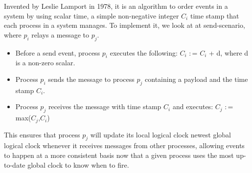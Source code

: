 Invented by Leslie Lamport in 1978, it is an algorithm to order events in a system by using scalar time, a simple non-negative integer $C_i$ time stamp that each process in a system manages. To implement it, we look at at send-scenario, where $p_i$ relays a message to $p_j$.

\begin{itemize}
	\item Before a send event, process $p_i$ executes the following: $C_i$ $\colon$=  $C_i$ + d, where d is a non-zero scalar.
	\item Process $p_i$ sends the message to process $p_j$ containing a payload and the time stamp $C_i$.
	\item Process $p_j$ receives the message with time stamp $C_i$ and executes: $C_j$ $\colon$= max($C_j$,$C_i$) 
\end{itemize}

This ensures that process $p_j$ will update its local logical clock newest global logical clock whenever it receives messages from other processes, allowing events to happen at a more consistent basis now that a given process uses the most up-to-date global clock to know when to fire.


